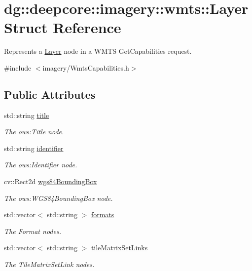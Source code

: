 \hypertarget{structdg_1_1deepcore_1_1imagery_1_1wmts_1_1_layer}{}\section{dg\+:\+:deepcore\+:\+:imagery\+:\+:wmts\+:\+:Layer Struct Reference}
\label{structdg_1_1deepcore_1_1imagery_1_1wmts_1_1_layer}


Represents a \hyperlink{structdg_1_1deepcore_1_1imagery_1_1wmts_1_1_layer}{Layer} node in a W\+M\+TS Get\+Capabilities request.  




{\ttfamily \#include $<$imagery/\+Wmts\+Capabilities.\+h$>$}

\subsection*{Public Attributes}
\begin{DoxyCompactItemize}
\item 
std\+::string \hyperlink{structdg_1_1deepcore_1_1imagery_1_1wmts_1_1_layer_a31a9052e2ccbf947e87c236f94172ceb}{title}
\begin{DoxyCompactList}\small\item\em The ows\+:Title node. \end{DoxyCompactList}\item 
std\+::string \hyperlink{structdg_1_1deepcore_1_1imagery_1_1wmts_1_1_layer_a903488a9e9c3157e8fb371a2f639ace8}{identifier}
\begin{DoxyCompactList}\small\item\em The ows\+:Identifier node. \end{DoxyCompactList}\item 
cv\+::\+Rect2d \hyperlink{structdg_1_1deepcore_1_1imagery_1_1wmts_1_1_layer_aa5965fd52b8132c904f537024885ff88}{wgs84\+Bounding\+Box}
\begin{DoxyCompactList}\small\item\em The ows\+:W\+G\+S84\+Bounding\+Box node. \end{DoxyCompactList}\item 
std\+::vector$<$ std\+::string $>$ \hyperlink{structdg_1_1deepcore_1_1imagery_1_1wmts_1_1_layer_a69d7446036c9e705673b24ef910f3702}{formats}
\begin{DoxyCompactList}\small\item\em The Format nodes. \end{DoxyCompactList}\item 
std\+::vector$<$ std\+::string $>$ \hyperlink{structdg_1_1deepcore_1_1imagery_1_1wmts_1_1_layer_a1b3f111751a740773df1ccb0039e587e}{tile\+Matrix\+Set\+Links}
\begin{DoxyCompactList}\small\item\em The Tile\+Matrix\+Set\+Link nodes. \end{DoxyCompactList}\end{DoxyCompactItemize}


